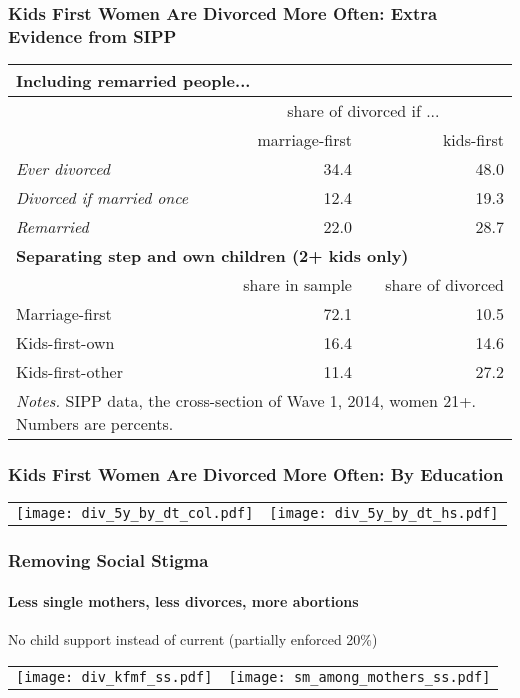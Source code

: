 \documentclass[aspectratio=169]{beamer}
\begin{document}
\begin{frame}[plain,label=emp-step]
\frametitle{Kids First Women Are Divorced More Often: Extra Evidence from SIPP}
\begin{center}
\begin{tabular}{l r r }
\hline
\multicolumn{3}{l}{\textbf{Including remarried people...}} \\\hline
& \multicolumn{2}{c}{share of divorced if ... }  \\
&  marriage-first & kids-first   \\\hline
\textit{Ever divorced} & 34.4 & 48.0  \\
\textit{Divorced if married once} &  12.4 & 19.3 \\
\textit{Remarried} &  22.0 & 28.7 \\\hline
\hline
\multicolumn{3}{l}{\textbf{Separating step and own children (2+ kids only)}} \\\hline
& share in sample & share of divorced   \\\hline
{Marriage-first} & 72.1 & 10.5 \\
{Kids-first-own} &  16.4 & 14.6 \\
{Kids-first-other} &  11.4 & 27.2 \\\hline
\multicolumn{3}{p{0.7\linewidth}}{\footnotesize \textit{Notes.} SIPP data, the cross-section of Wave 1, 2014, women 21+. Numbers are percents.}\\\hline\hline
\end{tabular}
\end{center}
\hyperlink{dt_more}{} 
\end{frame}


\begin{frame}[plain,label=dt_graph_educ]
\frametitle{Kids First Women Are Divorced More Often: By Education}

\begin{tabular}{c c}
\hspace{-0.5cm}\texttt{[image: div\_5y\_by\_dt\_col.pdf]} & \hspace{0.5cm}\texttt{[image: div\_5y\_by\_dt\_hs.pdf]}
\end{tabular}
\hyperlink{dt_graph}{} 
\end{frame}



\begin{frame}[label=counterfactuals-social-stigma]
\frametitle{Removing Social Stigma}
\framesubtitle{Less single mothers, less divorces, more abortions}
No child support instead of current (partially enforced 20\%)
\begin{center}
\begin{tabular}{c c}
\hspace{-1cm}\texttt{[image: div\_kfmf\_ss.pdf]}  & \hspace{-0.5cm} \texttt{[image: sm\_among\_mothers\_ss.pdf]} 
\end{tabular}
\end{center}
\hyperlink{counterfactuals-child-support}{} 
\end{frame}
\end{document}
